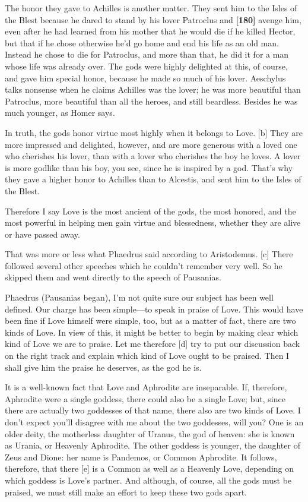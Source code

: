 The honor they gave to Achilles is another matter. They sent him to the
Isles of the Blest because he dared to stand by his lover Patroclus and
{\bf {[}180{]}} avenge him, even after he had learned from his mother
that he would die if he killed Hector, but that if he chose otherwise
he'd go home and end his life as an old man. Instead he chose to die for
Patroclus, and more than that, he did it for a man whose life was
already over. The gods were highly delighted at this, of course, and
gave him special honor, because he made so much of his lover. Aeschylus
talks nonsense when he claims Achilles was the
lover; he was more
beautiful than Patroclus, more beautiful than all the heroes, and still
beardless. Besides he was much younger, as Homer says.

In truth, the gods honor virtue most highly when it belongs to Love.
{[}b{]} They are more impressed and delighted, however, and are more
generous with a loved one who cherishes his lover, than with a lover who
cherishes the boy he loves. A lover is more godlike than his boy, you
see, since he is inspired by a god. That's why they gave a higher honor
to Achilles than to Alcestis, and sent him to the Isles of the Blest.

Therefore I say Love is the most ancient of the gods, the most honored,
and the most powerful in helping men gain virtue and blessedness,
whether they are alive or have passed away.

That was more or less what Phaedrus said according to Aristodemus.
{[}c{]} There followed several other speeches which he couldn't remember
very well. So he skipped them and went directly to the speech of
Pausanias.\crlf
\crlf

Phaedrus (Pausanias began), I'm not quite sure our subject has been well
defined. Our charge has been simple---to speak in praise of Love. This
would have been fine if Love himself were simple, too, but as a matter
of fact, there are two kinds of Love. In view of this, it might be
better to begin by making clear which kind of Love we are to praise. Let
me therefore {[}d{]} try to put our discussion back on the right track
and explain which kind of Love ought to be praised. Then I shall give
him the praise he deserves, as the god he is.

It is a well-known fact that Love and Aphrodite are inseparable. If,
therefore, Aphrodite were a single goddess, there could also be a single
Love; but, since there are actually two goddesses of that name, there
also are two kinds of Love. I don't expect you'll disagree with me about
the two goddesses, will you? One is an older deity, the motherless
daughter of Uranus, the god of heaven: she is known as Urania, or
Heavenly Aphrodite. The other goddess is younger, the daughter of Zeus
and Dione: her name is Pandemos, or Common Aphrodite. It follows,
therefore, that there {[}e{]} is a Common as well as a Heavenly Love,
depending on which goddess is Love's partner. And although, of course,
all the gods must be praised, we must still make an effort to keep these
two gods apart.

